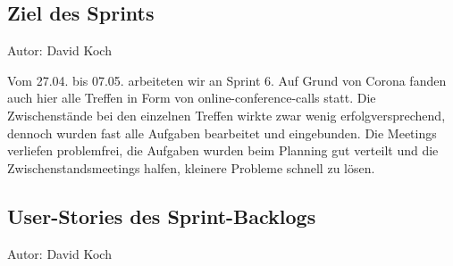 \subsection{Ziel des Sprints}
{\small Autor: David Koch}

Vom 27.04. bis 07.05. arbeiteten wir an Sprint 6. Auf Grund von Corona fanden auch hier alle Treffen in Form von online-conference-calls statt. Die Zwischenstände bei den einzelnen Treffen wirkte zwar wenig erfolgversprechend, dennoch wurden fast alle Aufgaben bearbeitet und eingebunden.
Die Meetings verliefen problemfrei, die Aufgaben wurden beim Planning gut verteilt und die Zwischenstandsmeetings halfen, kleinere Probleme schnell zu lösen.

\subsection{User-Stories des Sprint-Backlogs}
{\small Autor: David Koch}

